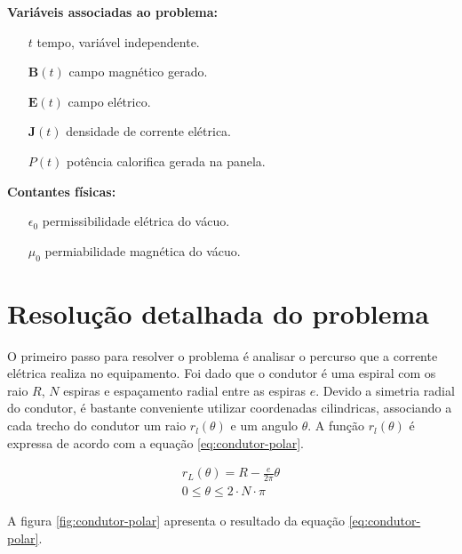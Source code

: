 \documentclass[
	article,			%
	11pt,				%
	oneside,			%
	a4paper,			%
	english,			%
	brazil,				%
	sumario=tradicional
	]{abntex2}
\begin{document}
\textbf{Variáveis associadas ao problema:}

\begin{itemize}
	\item[$ t $] tempo, variável independente.
	\item[$ \textbf{B}(t) $] campo magnético gerado.
	\item[$ \textbf{E}(t) $] campo elétrico.
	\item[$ \textbf{J}(t) $] densidade de corrente elétrica.
	\item[$ P(t) $] potência calorifica gerada na panela.
\end{itemize}

\textbf{Contantes físicas:}

\begin{itemize}
	\item[$ \epsilon_0 $] permissibilidade elétrica do vácuo.
	\item[$ \mu_0 $] permiabilidade magnética do vácuo.
\end{itemize}

\section{Resolução detalhada do problema}

O primeiro passo para resolver o problema é analisar o percurso que a corrente elétrica realiza no equipamento. Foi dado que o condutor é uma espiral com os raio $ R $, $ N $ espiras e espaçamento radial entre as espiras $ e $. Devido a simetria radial do condutor, é bastante conveniente utilizar coordenadas cilindricas, associando a cada trecho do condutor um raio $ r_l(\theta) $ e um angulo $ \theta $. A função $ r_l(\theta) $ é expressa de acordo com a equação \ref{eq:condutor-polar}.

\begin{equation} \label{eq:condutor-polar}
	\begin{array}{l}
		r_L(\theta) = R - \frac{e}{2\pi} \theta \\
		0 \le \theta \le 2\cdot N \cdot \pi
	\end{array}
\end{equation}

A figura \ref{fig:condutor-polar} apresenta o resultado da equação \ref{eq:condutor-polar}.
\end{document}
